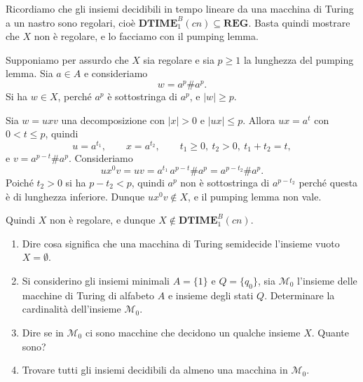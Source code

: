 \begin{sol}
Ricordiamo che gli insiemi decidibili in tempo lineare da una macchina di Turing a un nastro sono regolari, cioè $\mathbf{DTIME}^B_1(cn)\subseteq\mathbf{REG}$. Basta quindi mostrare che $X$ non è regolare, e lo facciamo con il pumping lemma.

Supponiamo per assurdo che $X$ sia regolare e sia $p\geq 1$ la lunghezza del pumping lemma. Sia $a\in A$ e consideriamo
\[
    w=a^p\#a^p.
\]
Si ha $w\in X$, perché $a^p$ è sottostringa di $a^p$, e $|w|\geq p$.

Sia $w=uxv$ una decomposizione con $|x|>0$ e $|ux|\leq p$. Allora $ux=a^t$ con $0<t\leq p$, quindi
\[
    u=a^{t_1},\qquad x=a^{t_2},\qquad t_1\geq 0,\ t_2>0,\ t_1+t_2=t,
\]
e $v=a^{p-t}\#a^p$. Consideriamo
\[
    ux^0v=uv=a^{t_1}\,a^{p-t}\#a^p=a^{p-t_2}\#a^p.
\]
Poiché $t_2>0$ si ha $p-t_2<p$, quindi $a^p$ non è sottostringa di $a^{p-t_2}$ perché questa è di lunghezza inferiore. Dunque $ux^0v\notin X$, e il pumping lemma non vale.

Quindi $X$ non è regolare, e dunque $X\notin\mathbf{DTIME}^B_1(cn)$.
\end{sol}

\newpage

\begin{ex}
\begin{enumerate}
    \item Dire cosa significa che una macchina di Turing semidecide l'insieme vuoto $X=\emptyset$.
    \item Si considerino gli insiemi minimali $A=\{1\}$ e $Q=\{q_0\}$, sia $\mathcal M_0$ l'insieme delle macchine di Turing di alfabeto $A$ e insieme degli stati $Q$. Determinare la cardinalità dell'insieme $\mathcal M_0$.
    \item Dire se in $\mathcal M_0$ ci sono macchine che decidono un qualche insieme $X$. Quante sono?
    \item Trovare tutti gli insiemi decidibili da almeno una macchina in $\mathcal M_0$.
\end{enumerate}
\end{ex}


